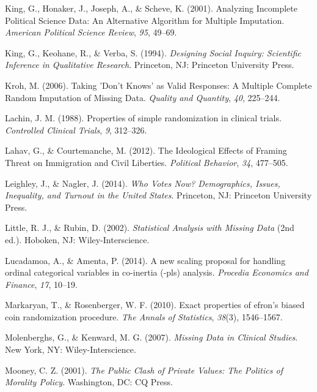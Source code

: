 \documentclass[12pt,econ]{sources/authesis}
\begin{document}
\leavevmode\hypertarget{ref-king_2001_analyzing}{}%
King, G., Honaker, J., Joseph, A., \& Scheve, K. (2001). Analyzing Incomplete Political Science Data: An Alternative Algorithm for Multiple Imputation. \emph{American Political Science Review}, \emph{95}, 49--69.

\leavevmode\hypertarget{ref-king_designing_1994}{}%
King, G., Keohane, R., \& Verba, S. (1994). \emph{Designing Social Inquiry: Scientific Inference in Qualitative Research}. Princeton, NJ: Princeton University Press.

\leavevmode\hypertarget{ref-kroh_2006_taking}{}%
Kroh, M. (2006). Taking 'Don't Knows' as Valid Responses: A Multiple Complete Random Imputation of Missing Data. \emph{Quality and Quantity}, \emph{40}, 225--244.

\leavevmode\hypertarget{ref-lachin_1988_properties}{}%
Lachin, J. M. (1988). Properties of simple randomization in clinical trials. \emph{Controlled Clinical Trials}, \emph{9}, 312--326.

\leavevmode\hypertarget{ref-lahav_ideological_2012}{}%
Lahav, G., \& Courtemanche, M. (2012). The Ideological Effects of Framing Threat on Immigration and Civil Liberties. \emph{Political Behavior}, \emph{34}, 477--505.

\leavevmode\hypertarget{ref-leighley_who_2014}{}%
Leighley, J., \& Nagler, J. (2014). \emph{Who Votes Now? Demographics, Issues, Inequality, and Turnout in the United States}. Princeton, NJ: Princeton University Press.

\leavevmode\hypertarget{ref-little_2002_statistical}{}%
Little, R. J., \& Rubin, D. (2002). \emph{Statistical Analysis with Missing Data} (2nd ed.). Hoboken, NJ: Wiley-Interscience.

\leavevmode\hypertarget{ref-lucadamoa_2014_scaling}{}%
Lucadamoa, A., \& Amenta, P. (2014). A new scaling proposal for handling ordinal categorical variables in co-inertia (-pls) analysis. \emph{Procedia Economics and Finance}, \emph{17}, 10--19.

\leavevmode\hypertarget{ref-markaryan_2010_exact}{}%
Markaryan, T., \& Rosenberger, W. F. (2010). Exact properties of efron's biased coin randomization procedure. \emph{The Annals of Statistics}, \emph{38}(3), 1546--1567.

\leavevmode\hypertarget{ref-molenberghs_2007_missing}{}%
Molenberghs, G., \& Kenward, M. G. (2007). \emph{Missing Data in Clinical Studies}. New York, NY: Wiley-Interscience.

\leavevmode\hypertarget{ref-mooney_public_2001}{}%
Mooney, C. Z. (2001). \emph{The Public Clash of Private Values: The Politics of Morality Policy}. Washington, DC: CQ Press.
\end{document}
